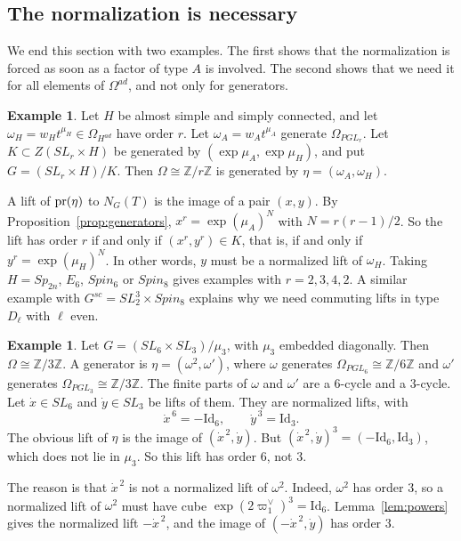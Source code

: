 \documentclass[psamsfonts]{amsart}
\theoremstyle{definition}
\newtheorem{exmp}[thm]{Example}
\theoremstyle{remark}
\numberwithin{equation}{section}
\newcommand{\Z}{\mathbb{Z}}   %
\numberwithin{equation}{section}
\newcommand{\om}{\omega}
\newcommand{\Om}{\Omega}
\newcommand\pr{\textup{pr}}
\newcommand{\Id}{\mathrm{Id}}
\theoremstyle{plain}
\begin{document}
\subsection{The normalization is necessary}\label{subsec:necessary}
We end this section with two examples. The first shows that the normalization is forced as soon as a factor of type $A$ is involved. The second shows that we need it for all elements of $\Om^{ad}$, and not only for generators.

\begin{exmp}\label{exmp:forced}
Let $H$ be almost simple and simply connected, and let $\om_H=w_Ht^{\mu_H}\in\Om_{H^{ad}}$ have order $r$. Let $\om_A=w_At^{\mu_A}$ generate $\Om_{PGL_r}$. Let $K\subset Z(SL_r\times H)$ be generated by $(\exp\mu_A,\exp\mu_H)$, and put $G=(SL_r\times H)/K$. Then $\Om\cong\Z/r\Z$ is generated by $\eta=(\om_A,\om_H)$.

A lift of $\pr(\eta)$ to $N_G(T)$ is the image of a pair $(x,y)$. By Proposition~\ref{prop:generators}, $x^r=\exp(\mu_A)^{N}$ with $N=r(r-1)/2$. So the lift has order $r$ if and only if $(x^r,y^r)\in K$, that is, if and only if $y^r=\exp(\mu_H)^N$. In other words, $y$ must be a normalized lift of $\om_H$. Taking $H=Sp_{2n}$, $E_6$, $Spin_6$ or $Spin_8$ gives examples with $r=2,3,4,2$. A similar example with $G^{sc}=SL_2^3\times Spin_8$ explains why we need commuting lifts in type $D_\ell$ with $\ell$ even.
\end{exmp}

\begin{exmp}\label{exmp:all-elements}
Let $G=(SL_6\times SL_3)/\mu_3$, with $\mu_3$ embedded diagonally. Then $\Om\cong\Z/3\Z$. A generator is $\eta=(\om^2,\om')$, where $\om$ generates $\Om_{PGL_6}\cong\Z/6\Z$ and $\om'$ generates $\Om_{PGL_3}\cong\Z/3\Z$. The finite parts of $\om$ and $\om'$ are a $6$-cycle and a $3$-cycle. Let $\dot x\in SL_6$ and $\dot y\in SL_3$ be lifts of them. They are normalized lifts, with
\[
\dot x^{\,6}=-\Id_6,\qquad\dot y^{\,3}=\Id_3.
\]
The obvious lift of $\eta$ is the image of $(\dot x^{\,2},\dot y)$. But $(\dot x^{\,2},\dot y)^3=(-\Id_6,\Id_3)$, which does not lie in $\mu_3$. So this lift has order $6$, not $3$.

The reason is that $\dot x^{\,2}$ is not a normalized lift of $\om^2$. Indeed, $\om^2$ has order $3$, so a normalized lift of $\om^2$ must have cube $\exp(2\varpi_1^\vee)^3=\Id_6$. Lemma~\ref{lem:powers} gives the normalized lift $-\dot x^{\,2}$, and the image of $(-\dot x^{\,2},\dot y)$ has order $3$.
\end{exmp}
\end{document}

